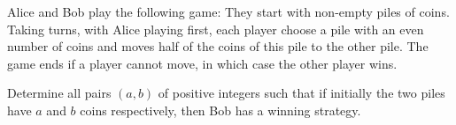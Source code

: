 Alice and Bob play the following game: They start with non-empty piles of coins. Taking turns, with Alice playing first, each player choose a pile with an even number of coins and moves half of the coins of this pile to the other pile.  The game ends if a player cannot move, in which case the other player wins.

Determine all pairs $(a,b)$ of positive integers such that if initially the two piles have $a$  and $b$ coins respectively, then Bob has a winning strategy.